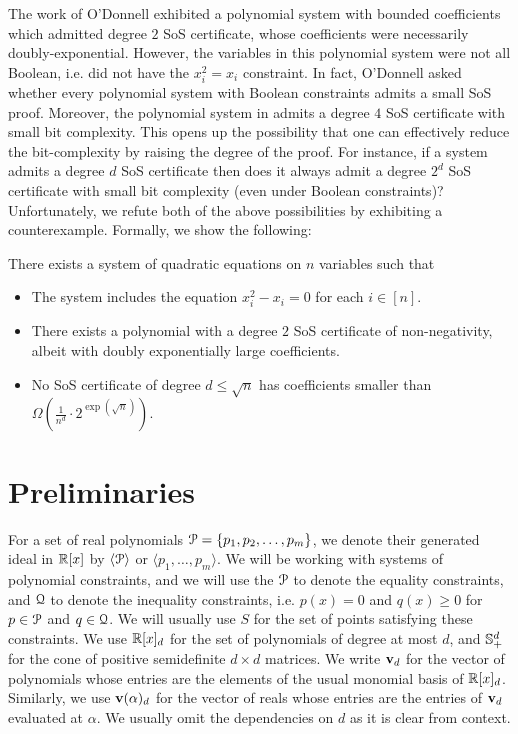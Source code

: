 \documentclass[a4paper,UKenglish]{lipics-v2016}
\begin{document}
The work of O'Donnell \cite{odonnell17} exhibited a polynomial system with bounded coefficients which admitted degree $2$ SoS certificate, whose coefficients were necessarily doubly-exponential.
However, the variables in this polynomial system were not all Boolean, i.e. did not have the $x_i^2 = x_i$ constraint.
In fact, O'Donnell asked whether every polynomial system with Boolean constraints admits a small SoS proof.
Moreover, the polynomial system in \cite{odonnell17} admits a degree $4$ SoS certificate with small bit complexity.  
This opens up the possibility that one can effectively reduce the bit-complexity by raising the degree of the proof.
For instance, if a system admits a degree $d$ SoS certificate then does it always admit a degree $2^d$ SoS certificate with small bit complexity (even under Boolean constraints)?
Unfortunately, we refute both of the above possibilities by exhibiting a counterexample.
Formally, we show the following:

\begin{theorem}\label{thm:counter}
	There exists a system of quadratic equations on $n$ variables such that
	\begin{itemize}
	\item The system includes the equation $x_i^2 - x_i = 0$ for each $i \in [n]$.
	\item There exists a polynomial with a degree $2$ SoS certificate of non-negativity, albeit with doubly exponentially large coefficients.
	\item No SoS certificate of degree $d \leq \sqrt{n}$ has coefficients smaller than $\Omega\left(\frac{1}{n^d}\cdot 2^{\exp(\sqrt{n})}\right)$.
	\end{itemize}	
\end{theorem}

\section{Preliminaries}
\label{sec:prelims}
For a set of real polynomials $\mathcal P = \{p_1, p_2, \dots, p_m\}$, we denote their generated ideal in $\mathbb R[x]$ by $\langle \mathcal P\rangle$ or $\langle p_1, \dots, p_m\rangle$. We will be working with systems of polynomial constraints, and we will use the $\mathcal P$ to denote the equality constraints, and $\mathcal Q$ to denote the inequality constraints, i.e. $p(x) = 0$ and $q(x) \geq 0$ for $p \in \mathcal P$ and $q \in \mathcal Q$. We will usually use $S$ for the set of points satisfying these constraints. We use $\mathbb R[x]_d$ for the set of polynomials of degree at most $d$, and $\mathbb{S}_+^{d}$ for the cone of positive semidefinite $d \times d$ matrices. We write ${\bf v}_d$ for the vector of polynomials whose entries are the elements of the usual monomial basis of $\mathbb R[x]_d$. Similarly, we use ${\bf v}(\alpha)_d$ for the vector of reals whose entries are the entries of ${\bf v}_d$ evaluated at $\alpha$. We usually omit the dependencies on $d$ as it is clear from context.
\end{document}
